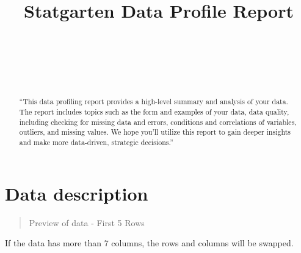 \documentclass{article}
\title{Statgarten Data Profile Report}
\author{
    
   \\
     \\
   \\
  \texttt{} \\
  }
\begin{document}
\maketitle


\begin{abstract}
``This data profiling report provides a high-level summary and analysis
of your data. The report includes topics such as the form and examples
of your data, data quality, including checking for missing data and
errors, conditions and correlations of variables, outliers, and missing
values. We hope you'll utilize this report to gain deeper insights and
make more data-driven, strategic decisions.''
\end{abstract}


\newpage

\hypertarget{data-description}{%
\section{Data description}\label{data-description}}

\begin{quote}
Preview of data - First 5 Rows
\end{quote}

If the data has more than 7 columns, the rows and columns will be
swapped.
\end{document}
